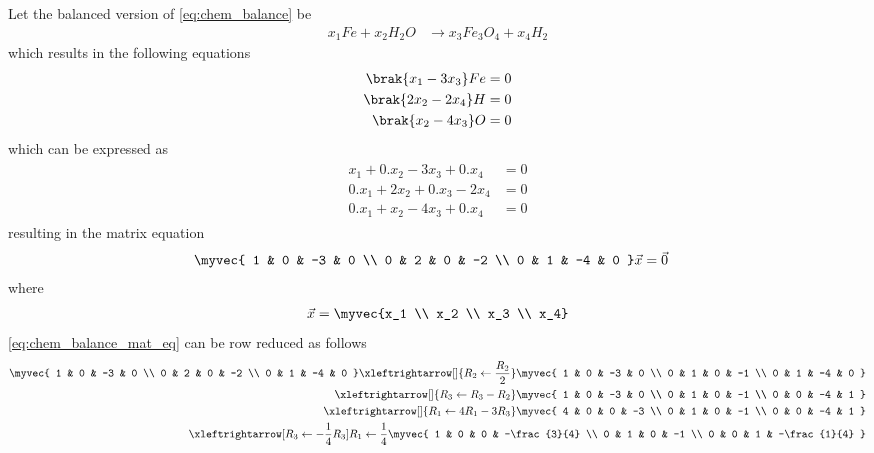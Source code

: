 
Let the balanced version of \eqref{eq:chem_balance} be 
%
\begin{align}
\label{eq:chem_balance_unsol}
x_1Fe+x_2H_2 O &\rightarrow x_3Fe_3 O_4 + x_4H_2
\end{align}
%
which results in the following equations
%
\begin{align}
\begin{split}
\brak{x_1 -3x_3}Fe &= 0
\\
\brak{2x_2 -2x_4}H &= 0
\\
\brak{x_2 -4x_3}O &= 0
\end{split}
\end{align}
which can be expressed as
\begin{align}
\begin{split}
x_1 + 0.x_2 -3x_3 +0.x_4&= 0
\\
0.x_1+2x_2 +0.x_3-2x_4 &= 0
\\
0.x_1+x_2 -4x_3+ 0.x_4 &= 0
\end{split}
\end{align}
%
resulting in the matrix equation
\begin{align}
\label{eq:chem_balance_mat_eq}
\begin{split}
\myvec{
1 & 0 & -3 & 0
\\
0 & 2 & 0 & -2
\\
0 & 1 & -4 & 0
}
\vec{x} &= \vec{0}
\end{split}
\end{align}
%
where
\begin{align}
\vec{x} = \myvec{x_1 \\ x_2 \\ x_3 \\ x_4} 
\end{align}
\eqref{eq:chem_balance_mat_eq} can be row reduced as follows
%
\begin{align}
\label{eq:chem_balance_mat_row}
\myvec{
1 & 0 & -3 & 0
\\
0 & 2 & 0 & -2
\\
0 & 1 & -4 & 0
}
 \xleftrightarrow[]{R_2 \leftarrow \frac{R_2}{2}}
\myvec{
1 & 0 & -3 & 0
\\
0 & 1 & 0 & -1
\\
0 & 1 & -4 & 0
}
\\
 \xleftrightarrow[]{R_3\leftarrow R_3-R_2}
\myvec{
1 & 0 & -3 & 0
\\
0 & 1 & 0 & -1
\\
0 & 0 & -4 & 1
}
\\
 \xleftrightarrow[]{R_1\leftarrow 4R_1-3R_3}
\myvec{
4 & 0 & 0 & -3
\\
0 & 1 & 0 & -1
\\
0 & 0 & -4 & 1
}
\\
 \xleftrightarrow[R_3 \leftarrow -\frac{1}{4}R_3]{R_1\leftarrow \frac{1}{4}}
\myvec{
1 & 0 & 0 & -\frac{3}{4}
\\
0 & 1 & 0 & -1
\\
0 & 0 & 1 & -\frac{1}{4}
}
\end{align}
